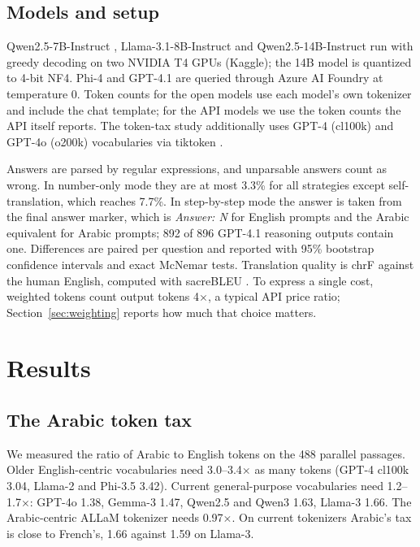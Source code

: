 \documentclass[conference,a4paper]{IEEEtran}
\begin{document}
\subsection{Models and setup}

Qwen2.5-7B-Instruct \cite{qwen}, Llama-3.1-8B-Instruct \cite{llama} and
Qwen2.5-14B-Instruct run with greedy decoding on two NVIDIA T4 GPUs (Kaggle);
the 14B model is quantized to 4-bit NF4. Phi-4 and GPT-4.1 are queried through
Azure AI Foundry at temperature 0. Token counts for the open models use each
model's own tokenizer and include the chat template; for the API models we use
the token counts the API itself reports. The token-tax study additionally uses
GPT-4 (cl100k) and GPT-4o (o200k) vocabularies via tiktoken \cite{tiktoken}.

Answers are parsed by regular expressions, and unparsable answers count as
wrong. In number-only mode they are at most 3.3\% for all strategies except
self-translation, which reaches 7.7\%. In step-by-step mode the answer is taken
from the final answer marker, which is \emph{Answer: N} for English prompts and
the Arabic equivalent for Arabic prompts; 892 of 896 GPT-4.1 reasoning outputs
contain one. Differences are paired per question and reported with 95\%
bootstrap confidence intervals and exact McNemar tests. Translation quality is
chrF \cite{chrf} against the human English, computed with sacreBLEU
\cite{sacrebleu}. To express a single cost, weighted tokens count output tokens
4$\times$, a typical API price ratio; Section~\ref{sec:weighting} reports how
much that choice matters.

\section{Results}

\subsection{The Arabic token tax}
\label{sec:tax}

We measured the ratio of Arabic to English tokens on the 488 parallel
passages. Older English-centric vocabularies need 3.0--3.4$\times$ as many
tokens (GPT-4 cl100k 3.04, Llama-2 and Phi-3.5 3.42). Current general-purpose
vocabularies need 1.2--1.7$\times$: GPT-4o 1.38, Gemma-3 1.47, Qwen2.5 and
Qwen3 1.63, Llama-3 1.66. The Arabic-centric ALLaM tokenizer needs
0.97$\times$. On current tokenizers Arabic's tax is close to French's, 1.66
against 1.59 on Llama-3.
\end{document}
